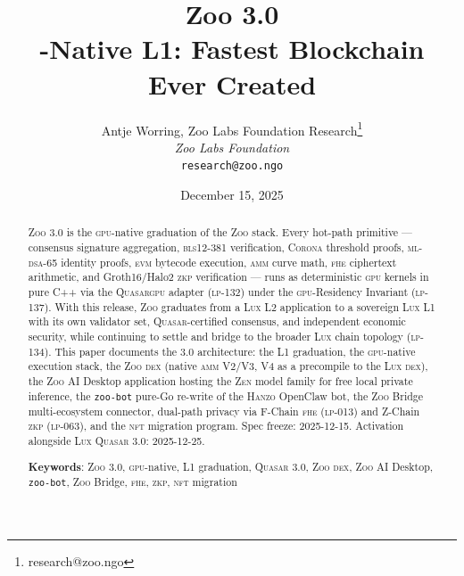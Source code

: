 \documentclass[11pt,letterpaper]{article}
\title{\textbf{Zoo 3.0}\\
\large \GPU{}-Native L1: Fastest Blockchain Ever Created}
\author{
Antje Worring, Zoo Labs Foundation Research\thanks{research@zoo.ngo}\\
\textit{Zoo Labs Foundation}\\
\texttt{research@zoo.ngo}
}
\date{December 15, 2025}
\newcommand{\Zoo}{\textsc{Zoo}}
\newcommand{\Lux}{\textsc{Lux}}
\newcommand{\Hanzo}{\textsc{Hanzo}}
\newcommand{\Zen}{\textsc{Zen}}
\newcommand{\Quasar}{\textsc{Quasar}}
\newcommand{\QuasarGPU}{\textsc{Quasar}\textsc{gpu}}
\newcommand{\GPU}{\textsc{gpu}}
\newcommand{\AMM}{\textsc{amm}}
\newcommand{\DEX}{\textsc{dex}}
\newcommand{\NFT}{\textsc{nft}}
\newcommand{\FHE}{\textsc{fhe}}
\newcommand{\ZKP}{\textsc{zkp}}
\newcommand{\BLS}{\textsc{bls}}
\newcommand{\MLDSA}{\textsc{ml-dsa}}
\newcommand{\Corona}{\textsc{Corona}}
\begin{document}
\zoocoverpage

\begin{abstract}
\Zoo{} 3.0 is the \GPU{}-native graduation of the \Zoo{} stack. Every hot-path primitive --- consensus signature aggregation, \BLS{}12-381 verification, \Corona{} threshold proofs, \MLDSA{}-65 identity proofs, \textsc{evm} bytecode execution, \AMM{} curve math, \FHE{} ciphertext arithmetic, and Groth16/Halo2 \ZKP{} verification --- runs as deterministic \GPU{} kernels in pure C++ via the \QuasarGPU{} adapter (\textsc{lp-132}) under the \GPU{}-Residency Invariant (\textsc{lp-137}). With this release, \Zoo{} graduates from a \Lux{} L2 application to a sovereign \Lux{} L1 with its own validator set, \Quasar{}-certified consensus, and independent economic security, while continuing to settle and bridge to the broader \Lux{} chain topology (\textsc{lp-134}). This paper documents the 3.0 architecture: the L1 graduation, the \GPU{}-native execution stack, the \Zoo{} \DEX{} (native \AMM{} V2/V3, V4 as a precompile to the \Lux{} \DEX{}), the \Zoo{} AI Desktop application hosting the \Zen{} model family for free local private inference, the \texttt{zoo-bot} pure-Go re-write of the \Hanzo{} OpenClaw bot, the \Zoo{} Bridge multi-ecosystem connector, dual-path privacy via F-Chain \FHE{} (\textsc{lp-013}) and Z-Chain \ZKP{} (\textsc{lp-063}), and the \NFT{} migration program. Spec freeze: 2025-12-15. Activation alongside \Lux{} \Quasar{} 3.0: 2025-12-25.

\textbf{Keywords}: \Zoo{} 3.0, \GPU{}-native, L1 graduation, \Quasar{} 3.0, \Zoo{} \DEX{}, \Zoo{} AI Desktop, \texttt{zoo-bot}, \Zoo{} Bridge, \FHE{}, \ZKP{}, \NFT{} migration
\end{abstract}

\tableofcontents
\newpage












\end{document}
